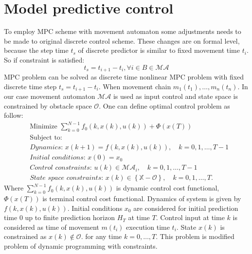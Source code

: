 \section{Model predictive control}
\noindent To employ MPC scheme with movement automaton some adjustments needs to be made to original discrete control scheme. These changes are on formal level, because the step time $t_s$ of discrete predictor is similar to fixed movement time $t_i$. So if constraint is satisfied:
\begin{equation}
    t_s = t_{i+1}-t_i, \forall i \in B\in\mathscr{MA} 
\end{equation}
\noindent MPC problem can be solved as discrete time nonlinear MPC problem with fixed discrete time step $t_s = t_{i+1}-t_i$. When movement chain $m_1(t_1),\dots,m_n(t_n)$.
In our case movement automaton $\mathscr{MA}$ is used as input control and state space is constrained by obstacle space $\mathscr{O}$. One can define optimal control problem as follow:
\begin{equation}\label{eq:minProblem}
    \begin{split}
        &\text{Minimize } \sum_{k=0}^{N-1} f_0(k,x(k),u(k)) + \Phi(x(T))\\
        &\text{Subject to: }\\
        &\textit{Dynamics: } x(k+1) = f(k,x(k),u(k)),\quad
        k = 0,1,\dots,T-1\\
        &\textit{Initial conditions: } x(0)= x_0\\
        &\textit{Control constraints: } u(k)\in\mathscr{MA}_i,\quad k = 0,1,\dots
        , T-1\\
        &\textit{State space constraints: } x(k)\in\left\{\mathbb{X}-\mathscr{O}\right\},\quad k = 0,1,\dots
        , T.
    \end{split}
\end{equation}
\noindent Where $\sum_{k=0}^{N-1} f_0(k,x(k),u(k))$ is dynamic control cost functional, $\Phi(x(T))$ is terminal control cost functional. Dynamics of system is given by $f(k,x(k),u(k))$. Initial conditions $x_0$ are considered for initial prediction time $0$ up to finite prediction horizon $H_T$ at time $T$. Control input at time $k$ is considered as time of movement $m(t_i)$ execution time $t_i$. State $x(k)$ is constrained as $x(k)\notin\mathscr{O}$. for any time $k=0,\dots,T$. This problem is modified problem of dynamic programming with constraints.


